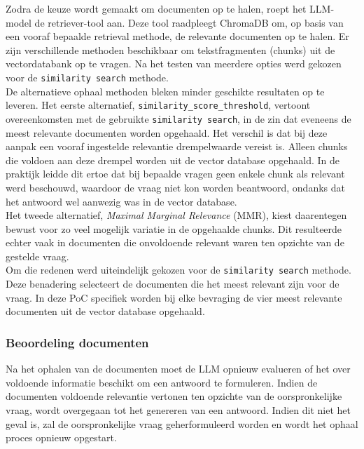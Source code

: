 Zodra de keuze wordt gemaakt om documenten op te halen, roept het LLM-model de retriever-tool aan. Deze tool raadpleegt ChromaDB om, op basis van een vooraf bepaalde retrieval methode, de relevante documenten op te halen. Er zijn verschillende methoden beschikbaar om tekstfragmenten (chunks) uit de vectordatabank op te vragen. Na het testen van meerdere opties werd gekozen voor de \verb|similarity search| methode.
\\[1em]
De alternatieve ophaal methoden bleken minder geschikte resultaten op te leveren. Het eerste alternatief, \verb|similarity_score_threshold|, vertoont overeenkomsten met de gebruikte \verb|similarity search|, in de zin dat eveneens de meest relevante documenten worden opgehaald. Het verschil is dat bij deze aanpak een vooraf ingestelde relevantie drempelwaarde vereist is. Alleen chunks die voldoen aan deze drempel worden uit de vector database opgehaald. In de praktijk leidde dit ertoe dat bij bepaalde vragen geen enkele chunk als relevant werd beschouwd, waardoor de vraag niet kon worden beantwoord, ondanks dat het antwoord wel aanwezig was in de vector database.  
\\[1em]
Het tweede alternatief, \textit{Maximal Marginal Relevance} (MMR), kiest daarentegen bewust voor zo veel mogelijk variatie in de opgehaalde chunks. Dit resulteerde echter vaak in documenten die onvoldoende relevant waren ten opzichte van de gestelde vraag.  
\\[1em]
Om die redenen werd uiteindelijk gekozen voor de \verb|similarity search| methode. Deze benadering selecteert de documenten die het meest relevant zijn voor de vraag. In deze PoC specifiek worden bij elke bevraging de vier meest relevante documenten uit de vector database opgehaald.

\subsubsection{Beoordeling documenten}

Na het ophalen van de documenten moet de LLM opnieuw evalueren of het over voldoende informatie beschikt om een antwoord te formuleren. Indien de documenten voldoende relevantie vertonen ten opzichte van de oorspronkelijke vraag, wordt overgegaan tot het genereren van een antwoord. Indien dit niet het geval is, zal de oorspronkelijke vraag geherformuleerd worden en wordt het ophaal proces opnieuw opgestart.

